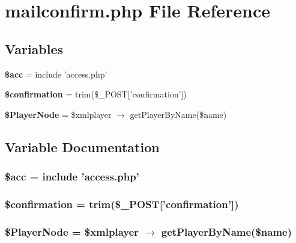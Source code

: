 \section{mailconfirm.php File Reference}
\label{mailconfirm_8php}


\subsection*{Variables}
\begin{CompactItemize}
\item 
{\bf \$acc} = include 'access.php'
\item 
{\bf \$confirmation} = trim(\$\_\-POST['confirmation'])
\item 
{\bf \$Player\-Node} = \$xmlplayer $\rightarrow$ get\-Player\-By\-Name(\$name)
\end{CompactItemize}


\subsection{Variable Documentation}
\subsubsection{\setlength{\rightskip}{0pt plus 5cm}\$acc = include 'access.php'}\label{mailconfirm_8php_542926c588a05eb69553d79c83cf73da}


\subsubsection{\setlength{\rightskip}{0pt plus 5cm}\$confirmation = trim(\$\_\-POST['confirmation'])}\label{mailconfirm_8php_06fd2a84877c88ac286f643dcdd6afd5}


\subsubsection{\setlength{\rightskip}{0pt plus 5cm}\$Player\-Node = \$xmlplayer $\rightarrow$ get\-Player\-By\-Name(\$name)}\label{mailconfirm_8php_90668b8131a1c418248aef66339e32d6}


